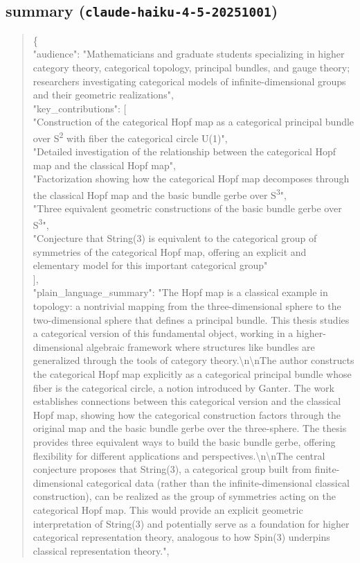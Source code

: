 \documentclass[11pt]{article}
\begin{document}
\subsection*{summary (\texttt{claude-haiku-4-5-20251001})}
\begin{quote}\small\ttfamily\raggedright
\{\\
  "audience": "Mathematicians and graduate students specializing in higher category theory, categorical topology, principal bundles, and gauge theory; researchers investigating categorical models of infinite-dimensional groups and their geometric realizations",\\
  "key\_contributions": [\\
    "Construction of the categorical Hopf map as a categorical principal bundle over S\textsuperscript{2} with fiber the categorical circle U(1)",\\
    "Detailed investigation of the relationship between the categorical Hopf map and the classical Hopf map",\\
    "Factorization showing how the categorical Hopf map decomposes through the classical Hopf map and the basic bundle gerbe over S\textsuperscript{3}",\\
    "Three equivalent geometric constructions of the basic bundle gerbe over S\textsuperscript{3}",\\
    "Conjecture that String(3) is equivalent to the categorical group of symmetries of the categorical Hopf map, offering an explicit and elementary model for this important categorical group"\\
  ],\\
  "plain\_language\_summary": "The Hopf map is a classical example in topology: a nontrivial mapping from the three-dimensional sphere to the two-dimensional sphere that defines a principal bundle. This thesis studies a categorical version of this fundamental object, working in a higher-dimensional algebraic framework where structures like bundles are generalized through the tools of category theory.\textbackslash{}n\textbackslash{}nThe author constructs the categorical Hopf map explicitly as a categorical principal bundle whose fiber is the categorical circle, a notion introduced by Ganter. The work establishes connections between this categorical version and the classical Hopf map, showing how the categorical construction factors through the original map and the basic bundle gerbe over the three-sphere. The thesis provides three equivalent ways to build the basic bundle gerbe, offering flexibility for different applications and perspectives.\textbackslash{}n\textbackslash{}nThe central conjecture proposes that String(3), a categorical group built from finite-dimensional categorical data (rather than the infinite-dimensional classical construction), can be realized as the group of symmetries acting on the categorical Hopf map. This would provide an explicit geometric interpretation of String(3) and potentially serve as a foundation for higher categorical representation theory, analogous to how Spin(3) underpins classical representation theory.",\\

\end{quote}
\end{document}
